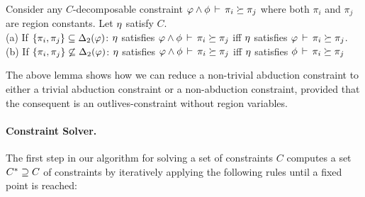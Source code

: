 \begin{lemma}
  \label{lemma:decomposition}
Consider any $C$-decomposable constraint $\varphi \wedge \phi\,\vdash\,\pi_i \succeq \pi_j$
where both $\pi_i$ and $\pi_j$ are region constants.
Let $\eta$ satisfy $C$.\\
(a) If $\{ \pi_i, \pi_j \} \subseteq {\Delta_2}(\varphi)$:
$\eta$ satisfies $\varphi \wedge \phi\,\vdash\,\pi_i \succeq \pi_j$
iff
$\eta$ satisfies $\varphi\,\vdash\,\pi_i \succeq \pi_j$.\\
(b) If $\{ \pi_i, \pi_j \} \not \subseteq {\Delta_2}(\varphi)$:
$\eta$ satisfies $\varphi \wedge \phi\,\vdash\,\pi_i \succeq \pi_j$
iff
$\eta$ satisfies $\phi\,\vdash\,\pi_i \succeq \pi_j$
\end{lemma}

The above lemma shows how we can reduce a non-trivial abduction constraint to
either a trivial abduction constraint or a non-abduction constraint,
provided that the consequent is an outlives-constraint without region variables.

\paragraph{Constraint Solver.}
The first step in our algorithm for solving a set of constraints $C$
computes a set ${C}^* \supseteq C$ of constraints by iteratively applying
the following rules until a fixed point is reached:

